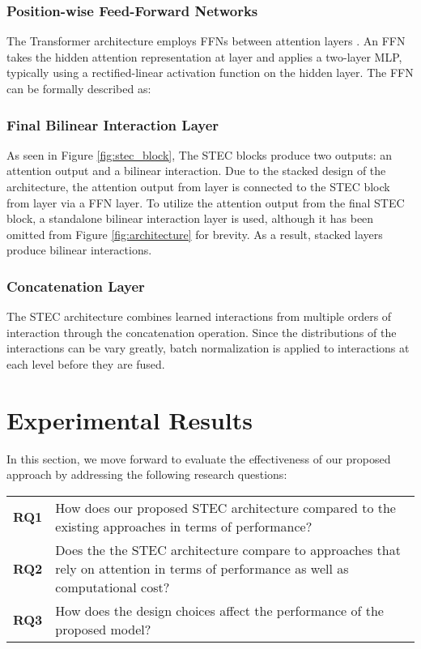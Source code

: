 \documentclass{article}
\begin{document}
\subsubsection{Position-wise Feed-Forward Networks}

The Transformer architecture employs FFNs between attention layers \cite{vaswani2023attention}. An FFN takes the hidden attention representation  at layer  and applies a two-layer MLP, typically using a rectified-linear activation function on the hidden layer. The FFN can be formally described as:



\subsubsection{Final Bilinear Interaction Layer}

As seen in Figure \ref{fig:stec_block}, The STEC blocks produce two outputs: an attention output and a bilinear interaction. Due to the stacked design of the architecture, the attention output from layer  is connected to the STEC block from layer  via a FFN layer. To utilize the attention output from the final STEC block, a standalone bilinear interaction layer is used, although it has been omitted from Figure \ref{fig:architecture} for brevity. As a result,  stacked layers produce  bilinear interactions.

\subsubsection{Concatenation Layer}

The STEC architecture combines learned interactions from multiple orders of interaction through the concatenation operation. Since the distributions of the interactions can be vary greatly, batch normalization is applied to interactions at each level before they are fused.



\section{Experimental Results}

In this section, we move forward to evaluate the effectiveness of our proposed approach by addressing the following research questions:

\begin{table}[h]
\centering
\begin{tabularx}{\columnwidth}{lX}
    \textbf{RQ1} & How does our proposed STEC architecture compared to the existing approaches in terms of performance?                                                  \\
    \textbf{RQ2} & Does the the STEC architecture compare to approaches that rely on attention in terms of performance as well as computational cost? \\
    \textbf{RQ3} & How does the design choices affect the performance of the proposed model? \\
\end{tabularx}
\end{table}
\end{document}
